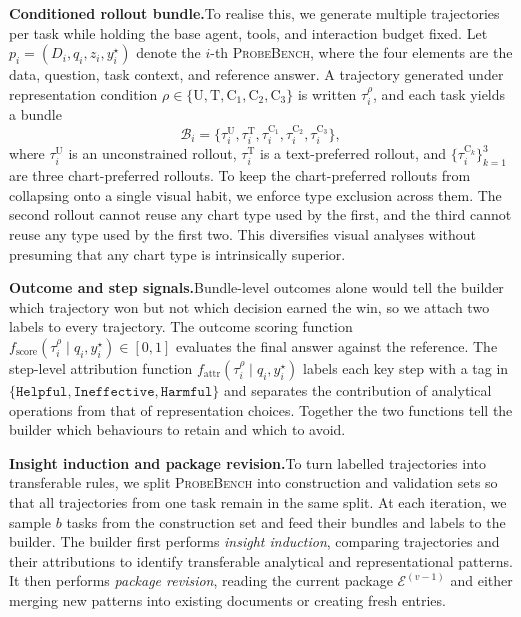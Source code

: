 \documentclass{article}
\newcommand{\probe}{\textsc{ProbeBench}\xspace}
\newcommand{\stitle}[1]{\noindent\textbf{#1}}
\begin{document}
\stitle{Conditioned rollout bundle.}\quad To realise this, we generate multiple trajectories per task while holding the base agent, tools, and interaction budget fixed. Let $p_i=(D_i,q_i,z_i,y_i^{\star})$ denote the $i$-th \probe{}, where the four elements are the data, question, task context, and reference answer. A trajectory generated under representation condition $\rho\in\{\mathrm{U},\mathrm{T},\mathrm{C}_1,\mathrm{C}_2,\mathrm{C}_3\}$ is written $\tau_i^{\rho}$, and each task yields a bundle
\begin{equation}
\mathcal{B}_i=\bigl\{\tau_i^{\mathrm{U}},\tau_i^{\mathrm{T}},\tau_i^{\mathrm{C}_1},\tau_i^{\mathrm{C}_2},\tau_i^{\mathrm{C}_3}\bigr\},
\end{equation}
where $\tau_i^{\mathrm{U}}$ is an unconstrained rollout, $\tau_i^{\mathrm{T}}$ is a text-preferred rollout, and $\{\tau_i^{\mathrm{C}_k}\}_{k=1}^{3}$ are three chart-preferred rollouts. To keep the chart-preferred rollouts from collapsing onto a single visual habit, we enforce type exclusion across them. The second rollout cannot reuse any chart type used by the first, and the third cannot reuse any type used by the first two. This diversifies visual analyses without presuming that any chart type is intrinsically superior.

\stitle{Outcome and step signals.}\quad Bundle-level outcomes alone would tell the builder which trajectory won but not which decision earned the win, so we attach two labels to every trajectory. The outcome scoring function $f_{\mathrm{score}}(\tau_i^{\rho}\mid q_i,y_i^{\star})\!\in\![0,1]$ evaluates the final answer against the reference. The step-level attribution function $f_{\mathrm{attr}}(\tau_i^{\rho}\mid q_i,y_i^{\star})$ labels each key step with a tag in $\{\texttt{Helpful},\texttt{Ineffective},\texttt{Harmful}\}$ and separates the contribution of analytical operations from that of representation choices. Together the two functions tell the builder which behaviours to retain and which to avoid.

\stitle{Insight induction and package revision.}\quad To turn labelled trajectories into transferable rules, we split \probe{} into construction and validation sets so that all trajectories from one task remain in the same split. At each iteration, we sample $b$ tasks from the construction set and feed their bundles and labels to the builder. The builder first performs \textit{insight induction}, comparing trajectories and their attributions to identify transferable analytical and representational patterns. It then performs \textit{package revision}, reading the current package $\mathcal{E}^{(v-1)}$ and either merging new patterns into existing documents or creating fresh entries.
\end{document}
